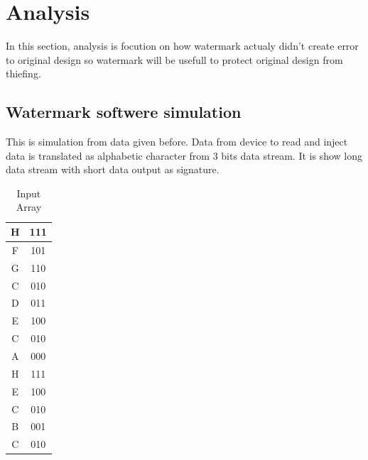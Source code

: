 \documentclass[10pt,journal,compsoc]{IEEEtran}
\begin{document}
\section{Analysis}
In this section, analysis is focution on how watermark actualy didn't create error to original design
so watermark will be usefull to protect original design from thiefing.

\subsection{Watermark softwere simulation}
This is simulation from data given before. Data from device to read and inject data is translated as alphabetic character from 3 bits data stream. It is show long data stream with short data output as signature.
{\renewcommand{\arraystretch}{1.2}
\begin{table}[h]
	\centering
	\caption{Input Array}
	\label{inputarray}
	\begin{tabular}{|c|c|}
		\hline
		H                            & 111                                      \\ \hline
		F                            & 101                                      \\ \hline
		G                            & 110                                      \\ \hline
		C                            & 010                                      \\ \hline
		D                            & 011                                      \\ \hline
		E                            & 100                                      \\ \hline
		C                            & 010                                      \\ \hline
		A                            & 000                                      \\ \hline
		H                            & 111                                      \\ \hline
		E                            & 100                                      \\ \hline
		C                            & 010                                      \\ \hline
		B                            & 001                                      \\ \hline
		C                            & 010                                      \\ \hline

\end{tabular}
\end{table}}
\end{document}

